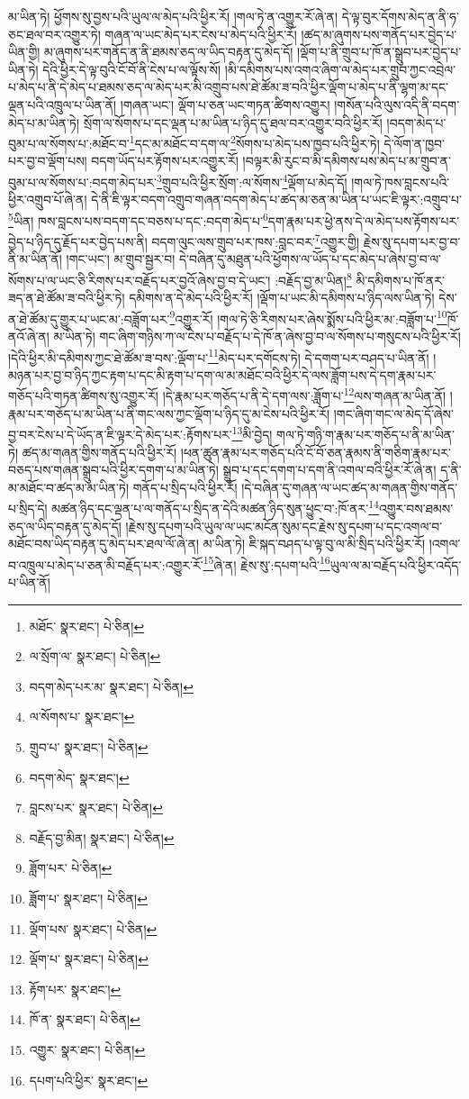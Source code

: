 མ་ཡིན་ཏེ། ཕྱོགས་སུ་བྱས་པའི་ཡུལ་ལ་མེད་པའི་ཕྱིར་རོ། །གལ་ཏེ་ན་འགྱུར་རོ་ཞེ་ན། དེ་ལྟ་བུར་དོགས་མེད་ན་ནི་ཧ་ཅང་ཐལ་བར་འགྱུར་ཏེ། གཞན་ལ་ཡང་མེད་པར་ངེས་པ་མེད་པའི་ཕྱིར་རོ། །ཚད་མ་ཞུགས་པས་གནོད་པར་བྱེད་པ་ཡིན་གྱི། མ་ཞུགས་པར་གནོད་ན་ནི་ཐམས་ཅད་ལ་ཡིད་བརྟན་དུ་མེད་དོ། །ལྡོག་པ་ནི་གྲུབ་པ་ཁོ་ན་སྒྲུབ་པར་བྱེད་པ་ཡིན་ཏེ། དེའི་ཕྱིར་དེ་ལྟ་བུའི་ངོ་བོ་ནི་ངེས་པ་ལ་ལྟོས་སོ། །མི་དམིགས་པས་འགའ་ཞིག་ལ་མེད་པར་གྲུབ་ཀྱང་འབྲེལ་པ་མེད་པ་ནི་དེ་མེད་པ་ཐམས་ཅད་ལ་མེད་པར་མི་འགྲུབ་པས་ཐེ་ཚོམ་ཟ་བའི་ཕྱིར་ལྡོག་པ་མེད་པ་ནི་ལྷག་མ་དང་ལྡན་པའི་འཁྲུལ་པ་ཡིན་ནོ། །གཞན་ཡང་། ལྡོག་པ་ཅན་ཡང་གཏན་ཚིགས་འགྱུར། །གསོན་པའི་ལུས་འདི་ནི་བདག་མེད་པ་མ་ཡིན་ཏེ། སྲོག་ལ་སོགས་པ་དང་ལྡན་པ་མ་ཡིན་པ་ཉིད་དུ་ཐལ་བར་འགྱུར་བའི་ཕྱིར་རོ། །བདག་མེད་པ་བུམ་པ་ལ་སོགས་པ་:མཐོང་བ་\footnote{མཐོང་  སྣར་ཐང་།  པེ་ཅིན། }དང་མ་མཐོང་བ་དག་ལ་\footnote{ལ་སྲོག་ལ་  སྣར་ཐང་།  པེ་ཅིན། }སོགས་པ་མེད་པས་ཁྱབ་པའི་ཕྱིར་ཏེ། དེ་ལོག་ན་ཁྱབ་པར་བྱ་བ་ལྡོག་པས། བདག་ཡོད་པར་རྟོགས་པར་འགྱུར་རོ། །བལྟར་མི་རུང་བ་མི་དམིགས་པས་མེད་པ་མ་གྲུབ་ན་བུམ་པ་ལ་སོགས་པ་:བདག་མེད་པར་\footnote{བདག་མེད་པར་མ་  སྣར་ཐང་།  པེ་ཅིན། }གྲུབ་པའི་ཕྱིར་སྲོག་:ལ་སོགས་\footnote{ལ་སོགས་པ་  སྣར་ཐང་། }ལྡོག་པ་མེད་དོ། །གལ་ཏེ་ཁས་བླངས་པའི་ཕྱིར་འགྲུབ་པོ་ཞེ་ན། དེ་ནི་ཇི་ལྟར་བདག་འགྲུབ་གཞན་བདག་མེད་པ་ཚད་མ་ཅན་མ་ཡིན་པ་ཡང་ཇི་ལྟར་:འགྲུབ་པ་\footnote{གྲུབ་པ་  སྣར་ཐང་།  པེ་ཅིན། }ཡིན། ཁས་བླངས་པས་བདག་དང་བཅས་པ་དང་:བདག་མེད་པ་\footnote{བདག་མེད་  སྣར་ཐང་། }དག་རྣམ་པར་ཕྱེ་ནས་དེ་ལ་མེད་པས་རྟོགས་པར་བྱེད་པ་ཉིད་དུ་རྗོད་པར་བྱེད་པས་ནི། བདག་ལུང་ལས་གྲུབ་པར་ཁས་:བླང་བར་\footnote{བླངས་པར་  སྣར་ཐང་།  པེ་ཅིན། }འགྱུར་གྱི། རྗེས་སུ་དཔག་པར་བྱ་བ་ནི་མ་ཡིན་ནོ། །གང་ཡང་། མ་གྲུབ་སྦྱར་བ། དེ་བཞིན་དུ་མཐུན་པའི་ཕྱོགས་ལ་ཡོད་པ་དང་མེད་པ་ཞེས་བྱ་བ་ལ་སོགས་པ་ལ་ཡང་ཅི་རིགས་པར་བརྗོད་པར་བྱའོ་ཞེས་བྱ་བ་དེ་ཡང་། :བརྗོད་བྱ་མ་ཡིན།\footnote{བརྗོད་བྱ་མིན།  སྣར་ཐང་།  པེ་ཅིན། } མི་དམིགས་པ་ཁོ་ནར་ཟད་ན་ཐེ་ཚོམ་ཟ་བའི་ཕྱིར་ཏེ། དམིགས་ན་དེ་མེད་པའི་ཕྱིར་རོ། །ལྡོག་པ་ཡང་མི་དམིགས་པ་ཉིད་ལས་ཡིན་ཏེ། དེས་ན་ཐེ་ཚོམ་དུ་གྱུར་པ་ཡང་མ་:བཟློག་པར་\footnote{ཟློག་པར་  པེ་ཅིན། }འགྱུར་རོ། །གལ་ཏེ་ཅི་རིགས་པར་ཞེས་སྨོས་པའི་ཕྱིར་མ་:བཟློག་པ་\footnote{ཟློག་པ་  སྣར་ཐང་།  པེ་ཅིན། }ཁོ་ནའོ་ཞེ་ན། མ་ཡིན་ཏེ། གང་ཞིག་གཉིས་ཀ་ལ་ངེས་པ་བརྗོད་པ་དེ་ཁོ་ན་ཞེས་བྱ་བ་ལ་སོགས་པ་གསུངས་པའི་ཕྱིར་རོ། །དེའི་ཕྱིར་མི་དམིགས་ཀྱང་ཐེ་ཚོམ་ཟ་བས་:ལྡོག་པ་\footnote{ལྡོག་པས་  སྣར་ཐང་།  པེ་ཅིན། }མེད་པར་དགོངས་ཏེ། དེ་དགག་པར་བཤད་པ་ཡིན་ནོ། །མཉན་པར་བྱ་བ་ཉིད་ཀྱང་རྟག་པ་དང་མི་རྟག་པ་དག་ལ་མ་མཐོང་བའི་ཕྱིར་དེ་ལས་ཟློག་པས་དེ་དག་རྣམ་པར་གཅོད་པའི་གཏན་ཚིགས་སུ་འགྱུར་རོ། །དེ་རྣམ་པར་གཅོད་པ་ནི་དེ་དག་ལས་:ཟློག་པ་\footnote{ལྡོག་པ་  སྣར་ཐང་།  པེ་ཅིན། }ལས་གཞན་མ་ཡིན་ནོ། །རྣམ་པར་གཅོད་པ་མ་ཡིན་པ་ནི་གང་ལས་ཀྱང་ལྡོག་པ་ཉིད་དུ་མ་ངེས་པའི་ཕྱིར་རོ། །གང་ཞིག་གང་ལ་མེད་དོ་ཞེས་བྱ་བར་ངེས་པ་དེ་ཡོད་ན་ཇི་ལྟར་དེ་མེད་པར་:རྟོགས་པར་\footnote{རྟོག་པར་  སྣར་ཐང་། }མི་བྱེད། གལ་ཏེ་གཉི་ག་རྣམ་པར་གཅོད་པ་ནི་མ་ཡིན་ཏེ། ཚད་མ་གཞན་གྱིས་གནོད་པའི་ཕྱིར་རོ། །ཕན་ཚུན་རྣམ་པར་གཅོད་པའི་ངོ་བོ་ཅན་རྣམས་ནི་གཅིག་རྣམ་པར་བཅད་པས་གཞན་སྒྲུབ་པའི་ཕྱིར་དགག་པ་མ་ཡིན་ཏེ། སྒྲུབ་པ་དང་དགག་པ་དག་ནི་འགལ་བའི་ཕྱིར་རོ་ཞེ་ན། ད་ནི་མ་མཐོང་བ་ཚད་མ་མ་ཡིན་ཏེ། གནོད་པ་སྲིད་པའི་ཕྱིར་རོ། །དེ་བཞིན་དུ་གཞན་ལ་ཡང་ཚད་མ་གཞན་གྱིས་གནོད་པ་སྲིད་དེ། མཚན་ཉིད་དང་ལྡན་པ་ལ་གནོད་པ་སྲིད་ན་དེའི་མཚན་ཉིད་སུན་ཕྱུང་བ་:ཁོ་ནར་\footnote{ཁོ་ན་  སྣར་ཐང་།  པེ་ཅིན། }འགྱུར་བས་ཐམས་ཅད་ལ་ཡིད་བརྟན་དུ་མེད་དོ། །རྗེས་སུ་དཔག་པའི་ཡུལ་ལ་ཡང་མངོན་སུམ་དང་རྗེས་སུ་དཔག་པ་དང་འགལ་བ་མཐོང་བས་ཡིད་བརྟན་དུ་མེད་པར་ཐལ་ལོ་ཞེ་ན། མ་ཡིན་ཏེ། ཇི་སྐད་བཤད་པ་ལྟ་བུ་ལ་མི་སྲིད་པའི་ཕྱིར་རོ། །འགལ་བ་འཁྲུལ་པ་མེད་པ་ཅན་མི་བརྗོད་པར་:འགྱུར་རོ་\footnote{འགྱུར་  སྣར་ཐང་།  པེ་ཅིན། }ཞེ་ན། རྗེས་སུ་:དཔག་པའི་\footnote{དཔག་པའི་ཕྱིར་  སྣར་ཐང་། }ཡུལ་ལ་མ་བརྗོད་པའི་ཕྱིར་འདོད་པ་ཡིན་ནོ། 